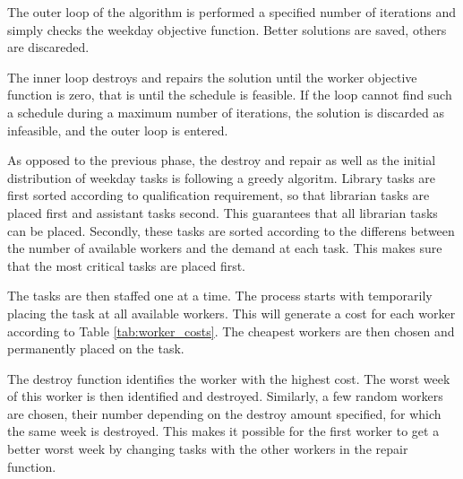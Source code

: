 The outer loop of the algorithm is performed a specified number of iterations and simply checks the weekday objective function. Better solutions are saved, others are discareded. 

The inner loop destroys and repairs the solution until the worker objective function is zero, that is until the schedule is feasible. If the loop cannot find such a schedule during a maximum number of iterations, the solution is discarded as infeasible, and the outer loop is entered.

As opposed to the previous phase, the destroy and repair as well as the initial distribution of weekday tasks is following a greedy algoritm. Library tasks are first sorted according to qualification requirement, so that librarian tasks are placed first and assistant tasks second. This guarantees that all librarian tasks can be placed. Secondly, these tasks are sorted according to the differens between the number of available workers and the demand at each task. This makes sure that the most critical tasks are placed first.

The tasks are then staffed one at a time. The process starts with temporarily placing the task at all available workers. This will generate a cost for each worker according to Table \ref{tab:worker_costs}. The cheapest workers are then chosen and permanently placed on the task.

The destroy function identifies the worker with the highest cost. The worst week of this worker is then identified and destroyed. Similarly, a few random workers are chosen, their number depending on the destroy amount specified, for which the same week is destroyed. This makes it possible for the first worker to get a better worst week by changing tasks with the other workers in the repair function.
